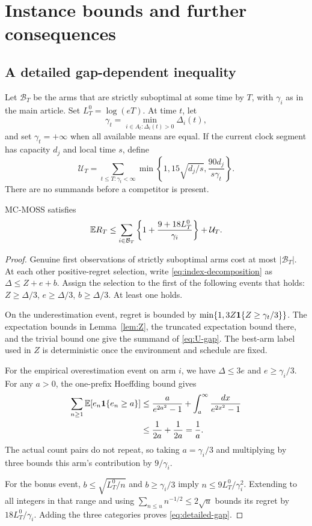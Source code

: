 \section{Instance bounds and further consequences}
\subsection{A detailed gap-dependent inequality}
Let $\mathcal B_T$ be the arms that are strictly suboptimal at some time by $T$, with $\gamma_i$ as in the main article. Set $L_T^0=\log(eT)$. At time $t$, let
\[
 \gamma_t=\min_{i\in A_t:\Delta_i(t)>0}\Delta_i(t),
\]
and set $\gamma_t=+\infty$ when all available means are equal. If the current clock segment has capacity $d_j$ and local time $s$, define
\begin{equation}\label{eq:U-gap}
 \mathcal U_T=\sum_{t\le T:\gamma_t<\infty}
 \min\left\{1,15\sqrt{d_j/s},\frac{90d_j}{s\gamma_t}\right\}.
\end{equation}
There are no summands before a competitor is present.

\begin{proposition}\label{prop:detailed-gap}
MC-MOSS satisfies
\begin{equation}\label{eq:detailed-gap}
 \mathbb E R_T\le\sum_{i\in\mathcal B_T}
 \left\{1+\frac{9+18L_T^0}{\gamma_i}\right\}+\mathcal U_T.
\end{equation}
\end{proposition}
\begin{proof}
Genuine first observations of strictly suboptimal arms cost at most $|\mathcal B_T|$. At each other positive-regret selection, write \eqref{eq:index-decomposition} as $\Delta\le Z+e+b$. Assign the selection to the first of the following events that holds: $Z\ge\Delta/3$, $e\ge\Delta/3$, $b\ge\Delta/3$. At least one holds.

On the underestimation event, regret is bounded by $\min\{1,3Z\mathbf 1\{Z\ge\gamma_t/3\}\}$. The expectation bounds in Lemma~\ref{lem:Z}, the truncated expectation bound there, and the trivial bound one give the summand of \eqref{eq:U-gap}. The best-arm label used in $Z$ is deterministic once the environment and schedule are fixed.

For the empirical overestimation event on arm $i$, we have $\Delta\le3e$ and $e\ge\gamma_i/3$. For any $a>0$, the one-prefix Hoeffding bound gives
\begin{align*}
 \sum_{n\ge1}\mathbb E[e_n\mathbf 1\{e_n\ge a\}]
 &\le\frac{a}{e^{2a^2}-1}+\int_a^\infty\frac{dx}{e^{2x^2}-1}\\
 &\le\frac1{2a}+\frac1{2a}=\frac1a.
\end{align*}
The actual count pairs do not repeat, so taking $a=\gamma_i/3$ and multiplying by three bounds this arm's contribution by $9/\gamma_i$.

For the bonus event, $b\le\sqrt{L_T^0/n}$ and $b\ge\gamma_i/3$ imply $n\le9L_T^0/\gamma_i^2$. Extending to all integers in that range and using $\sum_{n\le u}n^{-1/2}\le2\sqrt u$ bounds its regret by $18L_T^0/\gamma_i$. Adding the three categories proves \eqref{eq:detailed-gap}.
\end{proof}

